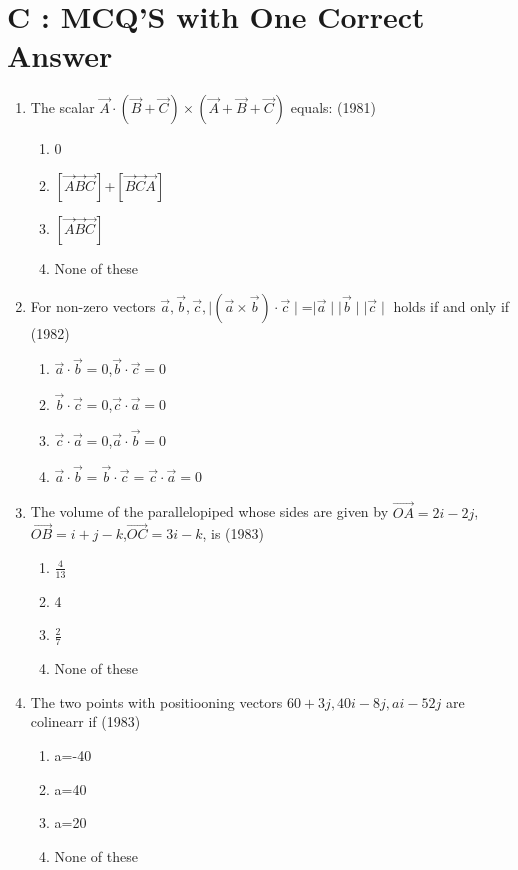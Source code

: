 \documentclass[12pt]{article}
\providecommand{\brak}[1]{\ensuremath{\left(#1\right)}}
\providecommand{\sbrak}[1]{\ensuremath{{}\left[#1\right]}}
\begin{document}
\section*{C  :   MCQ'S with One Correct Answer}

\begin{enumerate}
\item The scalar $\vec{A}\cdot\brak{\vec{B}+\vec{C}}\times\brak{\vec{A}+\vec{B}+\vec{C}}$ equals: (1981)
\begin{enumerate}
\item 0
\item $\sbrak{\vec{A} \vec{B} \vec{C}}$+$\sbrak{\vec{B} \vec{C} \vec{A}}$
\item $\sbrak{\vec{A} \vec{B} \vec{C}}$
\item None of these
\end{enumerate}
\item For non-zero vectors $\vec{a},\vec{b},\vec{c},\mid\brak{\vec{a}\times\vec{b}}\cdot\vec{c}\mid$=$\mid\vec{a}\mid \mid\vec{b}\mid \mid\vec{c}\mid$ holds if and only if        (1982)
\begin{enumerate}
\item $\vec{a}\cdot\vec{b}=0$,$\vec{b}\cdot\vec{c}=0$
\item $\vec{b}\cdot\vec{c}=0$,$\vec{c}\cdot\vec{a}=0$
\item $\vec{c}\cdot\vec{a}=0$,$\vec{a}\cdot\vec{b}=0$
\item $\vec{a}\cdot\vec{b}=\vec{b}\cdot\vec{c}=\vec{c}\cdot\vec{a}=0$
\end{enumerate}
\item The volume of the parallelopiped whose sides are given by $\overrightarrow{OA}=2i-2j$,$\overrightarrow{OB}=i+j-k$,$\overrightarrow{OC}=3i-k$, is (1983)
\begin{enumerate}
\item $\frac{4}{13}$
\item 4
\item $\frac{2}{7}$
\item None of these
\end{enumerate}
\item The two points with positiooning vectors $60+3j,40i-8j,ai-52j$ are colinearr if (1983)
\begin{enumerate}
\item a=-40
\item a=40
\item a=20
\item  None of these
\end{enumerate}

\end{enumerate}
\end{document}
